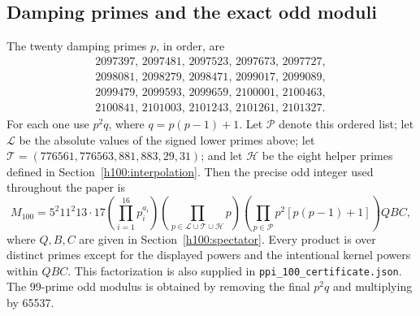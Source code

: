 \subsection{Damping primes and the exact odd moduli}
The twenty damping primes $p$, in order, are
\[
\begin{gathered}
2097397,\,2097481,\,2097523,\,2097673,\,2097727,\\
2098081,\,2098279,\,2098471,\,2099017,\,2099089,\\
2099479,\,2099593,\,2099659,\,2100001,\,2100463,\\
2100841,\,2101003,\,2101243,\,2101261,\,2101327.
\end{gathered}
\]
For each one use $p^2q$, where $q=p(p-1)+1$.
Let $\mathcal P$ denote this ordered list; let $\mathcal L$ be the absolute
values of the signed lower primes above; let
$\mathcal T=(776561,776563,881,883,29,31)$; and let $\mathcal H$
be the eight helper primes defined in Section~\ref{h100:interpolation}.
Then the precise odd integer used throughout the paper is
\begin{equation}\label{v2:eq:M100}
 M_{100}=5^2 11^2 13\cdot17
 \left(\prod_{i=1}^{16}p_i^{a_i}\right)
 \left(\prod_{p\in\mathcal L\cup\mathcal T\cup\mathcal H}p\right)
 \left(\prod_{p\in\mathcal P}p^2[p(p-1)+1]\right)QBC,
\end{equation}
where $Q,B,C$ are given in Section~\ref{h100:spectator}. Every product is
over distinct primes except for the displayed powers and the intentional
kernel powers within $QBC$. This factorization is also supplied in
\texttt{ppi\_100\_certificate.json}. The 99-prime odd modulus is obtained by
removing the final $p^2q$ and multiplying by 65537.


